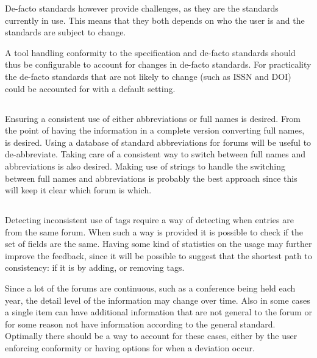 De-facto standards however provide challenges, as they are the
standards currently in use.  This means that they both depends on who
the user is and the standards are subject to change.

A tool handling conformity to the specification and de-facto standards
should thus be configurable to account for changes in de-facto
standards.  For practicality the de-facto standards that are not
likely to change (such as ISSN and DOI) could be accounted for with a
default setting.


\subsection{}

Ensuring a consistent use of either abbreviations or full names is
desired.  From the point of having the information in a complete
version converting full names,  is desired.
Using a database of standard abbreviations for forums will be useful
to de-abbreviate.  Taking care of a consistent way to switch between
full names and abbreviations is also desired.  Making use of strings
to handle the switching between full names and abbreviations is
probably the best approach since this will keep it clear which forum
is which.


\subsection{}

Detecting inconsistent use of tags require a way of detecting when
entries are from the same forum.  When such a way is provided it is
possible to check if the set of fields are the same.  Having some kind
of statistics on the usage may further improve the feedback, since it
will be possible to suggest that the shortest path to consistency: if
it is by adding, or removing tags.

Since a lot of the forums are continuous, such as a conference being
held each year, the detail level of the information may change over
time.  Also in some cases a single item can have additional
information that are not general to the forum or for some reason not
have information according to the general standard.  Optimally there
should be a way to account for these cases, either by the user
enforcing conformity or having options for when a deviation occur.


\subsection{}
\label{sec:approach_duplicates}

